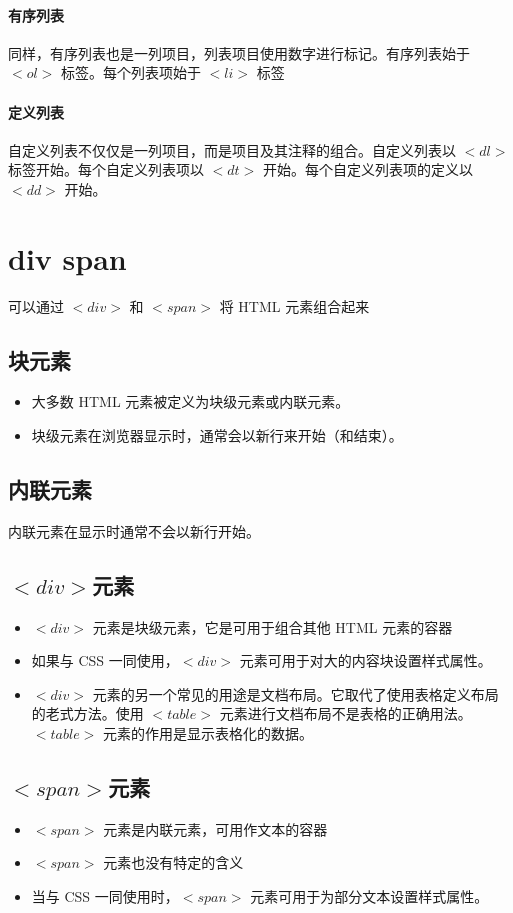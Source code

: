\documentclass[10pt,UTF8]{ctexart}
\begin{document}
\paragraph{有序列表}同样，有序列表也是一列项目，列表项目使用数字进行标记。有序列表始于 $<ol>$ 标签。每个列表项始于 $<li>$ 标签
\paragraph{定义列表}自定义列表不仅仅是一列项目，而是项目及其注释的组合。自定义列表以 $<dl>$ 标签开始。每个自定义列表项以 $<dt>$ 开始。每个自定义列表项的定义以 $<dd>$ 开始。

\section{div span}
可以通过 $<div>$ 和 $<span>$ 将 HTML 元素组合起来
\subsection{块元素}
\begin{itemize}
\item 大多数 HTML 元素被定义为块级元素或内联元素。
\item 块级元素在浏览器显示时，通常会以新行来开始（和结束）。
\end{itemize}
\subsection{内联元素}
内联元素在显示时通常不会以新行开始。
\subsection{$<div>$元素}
\begin{itemize}
\item $<div>$ 元素是块级元素，它是可用于组合其他 HTML 元素的容器
\item 如果与 CSS 一同使用，$<div>$ 元素可用于对大的内容块设置样式属性。
\item $<div>$ 元素的另一个常见的用途是文档布局。它取代了使用表格定义布局的老式方法。使用 $<table>$ 元素进行文档布局不是表格的正确用法。$<table>$ 元素的作用是显示表格化的数据。
\end{itemize}
\subsection{$<span>$元素}
\begin{itemize}
\item $<span>$ 元素是内联元素，可用作文本的容器
\item $<span>$ 元素也没有特定的含义
\item 当与 CSS 一同使用时，$<span>$ 元素可用于为部分文本设置样式属性。
\end{itemize}
\end{document}
